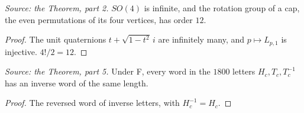 \begin{lemma}
  \label{lem:distinct-groups}
  \leanok
  \textit{Source: the Theorem, part 2.}
  \(SO(4)\) is infinite, and the rotation group of a cap, the even
  permutations of its four vertices, has order \(12\).
\end{lemma}
\begin{proof}
  \leanok
  The unit quaternions \(t+\sqrt{1-t^2}\,i\) are infinitely many, and
  \(p\mapsto L_{p,1}\) is injective. \(4!/2=12\).
\end{proof}

\begin{lemma}
  \label{lem:inverse-words}
  \leanok
  \textit{Source: the Theorem, part 5.}
  Under F, every word in the \(1800\) letters \(H_c,T_c,T_c^{-1}\) has an
  inverse word of the same length.
\end{lemma}
\begin{proof}
  \leanok
  The reversed word of inverse letters, with \(H_c^{-1}=H_c\).
\end{proof}

